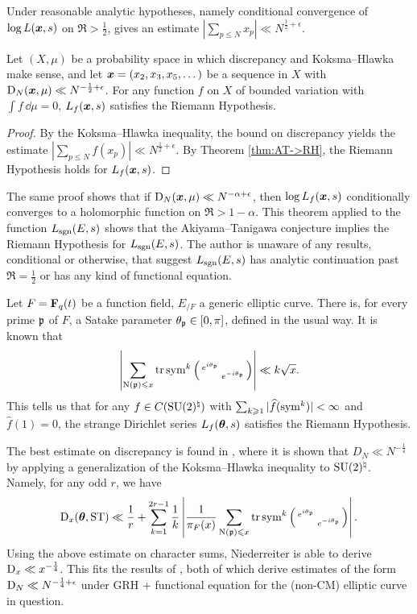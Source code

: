 Under reasonable analytic hypotheses, namely conditional convergence of 
$\log L({\boldsymbol x},s)$ on $\Re > \frac 1 2$, \cite[II.1 Th.~10]{tenenbaum-1995} gives 
an estimate $|\sum_{p\leqslant N} x_p| \ll N^{\frac 1 2 + \epsilon}$. 

\begin{theorem}
Let $(X,\mu)$ be a probability space in which discrepancy and Koksma--Hlawka 
make sense, and let ${\boldsymbol x}=(x_2,x_3,x_5,\dots)$ be a sequence in $X$ with 
$\operatorname{D}_N({\boldsymbol x},\mu) \ll N^{-\frac 1 2+\epsilon}$. For any function $f$ on $X$ of 
bounded variation with $\int f\, \dd\mu = 0$, $L_f({\boldsymbol x},s)$ satisfies 
the Riemann Hypothesis. 
\end{theorem}
\begin{proof}
By the Koksma--Hlawka inequality, the bound on discrepancy yields the estimate 
$\left| \sum_{p\leqslant N} f(x_p)\right| \ll N^{\frac 1 2+\epsilon}$. 
By Theorem \ref{thm:AT->RH}, the Riemann Hypothesis holds for $L_f({\boldsymbol x},s)$. 
\end{proof}

The same proof shows that if $\operatorname{D}_N({\boldsymbol x},\mu)\ll N^{-\alpha+\epsilon}$, then 
$\log L_f({\boldsymbol x},s)$ conditionally converges to a holomorphic function on 
$\Re > 1 - \alpha$. This theorem applied to the function $L_{\operatorname{sgn}}(E,s)$ shows 
that the Akiyama--Tanigawa conjecture implies the Riemann Hypothesis for 
$L_{\operatorname{sgn}}(E,s)$. The author is unaware of any results, conditional or 
otherwise, that suggest $L_{\operatorname{sgn}}(E,s)$ has analytic continuation past 
$\Re = \frac 1 2$ or has any kind of functional equation. 

Let $F = \mathbf{F}_q(t)$ be a function field, $E_{/F}$ a generic elliptic curve. 
There is, for every prime $\mathfrak{p}$ of $F$, a Satake parameter 
$\theta_{\mathfrak{p}} \in [0,\pi]$, defined in the usual way. It is known 
\cite[Ch.~3]{katz-1988} that
\[
	\left|\sum_{\operatorname{N}(\mathfrak{p}) \leqslant x} \operatorname{tr}\operatorname{sym}^k\left(\begin{smallmatrix} e^{i \theta_{\mathfrak{p}}} &  \\  & e^{- i \theta_{\mathfrak{p}}} \end{smallmatrix}\right) \right| \ll k \sqrt{x} .
\]
This tells us that for any $f\in C(\operatorname{SU}(2)^\natural)$ with 
$\sum_{k\geqslant 1} |\widehat f(\operatorname{sym}^k)|<\infty$ and $\widehat f(1) = 0$, 
the strange Dirichlet series $L_f({\boldsymbol\theta},s)$ satisfies the Riemann Hypothesis. 

The best estimate on discrepancy is found in 
\cite{niederreiter-1991}, where it is shown that $D_N \ll N^{-\frac 1 4}$ 
by applying a generalization of the Koksma--Hlawka inequality to 
$\operatorname{SU}(2)^\natural$. Namely, for any odd $r$, we have 
\[
	\operatorname{D}_x({\boldsymbol\theta},\mathrm{ST}) \ll \frac 1 r + \sum_{k=1}^{2 r -1} \frac 1 k \left| \frac{1}{\pi_F(x)} \sum_{\operatorname{N}(\mathfrak{p})\leqslant x} \operatorname{tr}\operatorname{sym}^k\left(\begin{smallmatrix} e^{i \theta_{\mathfrak{p}}} &  \\  & e^{- i \theta_{\mathfrak{p}}} \end{smallmatrix}\right)\right| .
\]
Using the above estimate on character sums, Niederreiter is able to derive 
$\operatorname{D}_x \ll x^{-\frac 1 4}$. This fits the results of 
\cite{bucar-kedlaya-2015,rouse-thorner-2016}, both of which derive estimates 
of the form $\operatorname{D}_N \ll N^{-\frac 1 4+\epsilon}$ under GRH + functional equation 
for the (non-CM) elliptic curve in question. 
